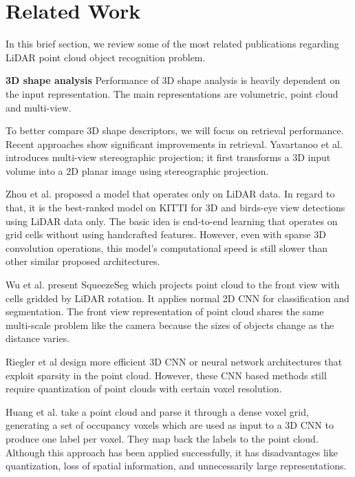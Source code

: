 \section{Related Work}\label{sec:relatedWork}
In this brief section, we review some of the most related publications regarding LiDAR point cloud object recognition problem.

\textbf{3D shape analysis} Performance of 3D shape analysis is heavily dependent on the input representation. 
The main representations are volumetric, point cloud and multi-view.

To better compare 3D shape descriptors, we will focus on retrieval performance. Recent
approaches show significant improvements in retrieval. Yavartanoo et al. \cite{DBLP:journals/corr/abs-1811-01571} 
introduces multi-view stereographic projection; it first transforms a 3D input volume into a 2D planar image using stereographic projection.

Zhou et al. \cite{Zhou_2018_CVPR} proposed a model that operates only on LiDAR data. 
In regard to that, it is the best-ranked model on KITTI \cite{geiger2012we} for 3D and birds-eye view detections using LiDAR data only. 
The basic idea is end-to-end learning that operates on grid cells without using handcrafted features. However, even with sparse 3D convolution 
operations, this model's computational speed is still slower than other similar proposed architectures.


Wu et al. \cite{DBLP:conf/icra/WuWYK18} present SqueezeSeg which projects point cloud to the front view with cells gridded by LiDAR rotation. 
It applies normal 2D CNN for classification and segmentation. The front view representation of point cloud shares 
the same multi-scale problem like the camera because the sizes of objects change as the distance varies.

Riegler et al \cite{DBLP:conf/cvpr/RieglerUG17} design more efficient 3D CNN or neural network architectures that exploit sparsity in the point cloud. 
However, these CNN based methods still require quantization of point clouds with certain voxel resolution.

Huang et al. \cite{DBLP:conf/icpr/HuangY16} take a point cloud and parse it through a dense voxel grid, generating a set of occupancy voxels which are used as input to a 3D CNN to produce one label per voxel. They map back the labels to the point cloud. Although this approach has been applied successfully, it has disadvantages like quantization, loss of spatial information, and unnecessarily large representations.

